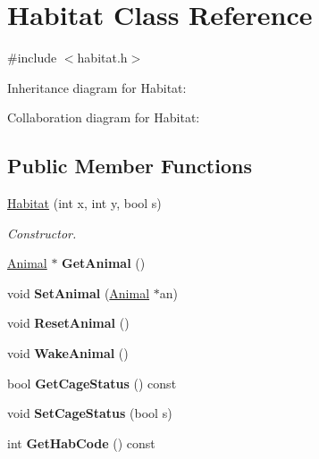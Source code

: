 \hypertarget{classHabitat}{}\section{Habitat Class Reference}
\label{classHabitat}


{\ttfamily \#include $<$habitat.\+h$>$}



Inheritance diagram for Habitat\+:


Collaboration diagram for Habitat\+:
\subsection*{Public Member Functions}
\begin{DoxyCompactItemize}
\item 
\hyperlink{classHabitat_a61acb402eadc9d0d59afbf6c7b4ecab8}{Habitat} (int x, int y, bool s)
\begin{DoxyCompactList}\small\item\em Constructor. \end{DoxyCompactList}\item 
\hyperlink{classAnimal}{Animal} $\ast$ {\bfseries Get\+Animal} ()\hypertarget{classHabitat_ac2a97a8db63bbdaf21c08c9142f82c8b}{}\label{classHabitat_ac2a97a8db63bbdaf21c08c9142f82c8b}

\item 
void {\bfseries Set\+Animal} (\hyperlink{classAnimal}{Animal} $\ast$an)\hypertarget{classHabitat_aa36b2746cd5fb3226326c216b7580a92}{}\label{classHabitat_aa36b2746cd5fb3226326c216b7580a92}

\item 
void {\bfseries Reset\+Animal} ()\hypertarget{classHabitat_a15d9564e90a44acb14d44876a51e2b37}{}\label{classHabitat_a15d9564e90a44acb14d44876a51e2b37}

\item 
void {\bfseries Wake\+Animal} ()\hypertarget{classHabitat_adaa76d3edb2ae65eb7207dbc8819a504}{}\label{classHabitat_adaa76d3edb2ae65eb7207dbc8819a504}

\item 
bool {\bfseries Get\+Cage\+Status} () const \hypertarget{classHabitat_a4ccefadc5d90a3c88be0b5b834e35613}{}\label{classHabitat_a4ccefadc5d90a3c88be0b5b834e35613}

\item 
void {\bfseries Set\+Cage\+Status} (bool s)\hypertarget{classHabitat_a3aae96d3931bbcb82fda11df414e9c16}{}\label{classHabitat_a3aae96d3931bbcb82fda11df414e9c16}

\item 
int {\bfseries Get\+Hab\+Code} () const \hypertarget{classHabitat_a3ba09f3044af3db6e894db0035f21b91}{}\label{classHabitat_a3ba09f3044af3db6e894db0035f21b91}

\end{DoxyCompactItemize}
